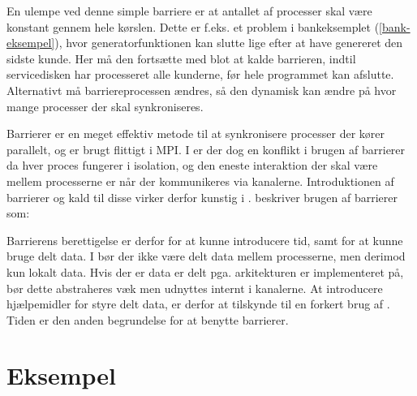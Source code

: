 En ulempe ved denne simple barriere er at antallet af processer skal være 
konstant gennem hele kørslen.
Dette er f.eks. et problem i bankeksemplet (\cref{bank-eksempel}), hvor 
generatorfunktionen kan slutte lige efter at have genereret den sidste kunde.  
Her må den fortsætte med blot at kalde barrieren, indtil servicedisken har 
processeret alle kunderne, før hele programmet kan afslutte. Alternativt må 
barriereprocessen ændres, så den dynamisk kan ændre på hvor mange processer der 
skal synkroniseres. 


Barrierer er en meget effektiv metode til at synkronisere processer der kører parallelt, og er brugt flittigt i MPI. I \csp er der dog en konflikt i brugen af barrierer da hver proces fungerer i isolation, og den eneste interaktion der skal være mellem processerne er når der kommunikeres via kanalerne. Introduktionen af barrierer og kald til disse virker derfor kunstig i \csp. \citeauthor{crew} beskriver brugen af barrierer som:


Barrierens berettigelse er derfor for at kunne introducere tid, samt for at kunne bruge delt data. I \csp bør der ikke være delt data mellem processerne, men derimod kun  lokalt data. Hvis der er data er delt pga. arkitekturen \csp er implementeret på, bør dette abstraheres væk men udnyttes internt i kanalerne. At introducere hjælpemidler for styre delt data, er derfor at tilskynde til en forkert brug af \csp. Tiden er den anden begrundelse for at benytte barrierer.

\section{Eksempel}


